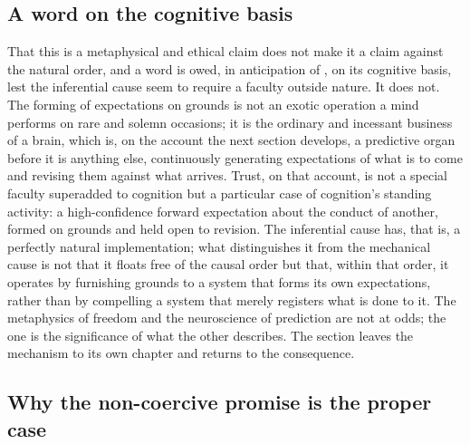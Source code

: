 \subsection{A word on the cognitive basis}
\label{p13:sub:free-cognitive}

That this is a metaphysical and ethical claim does not make it a claim against the natural order, and a word is owed, in anticipation of , on its cognitive basis, lest the inferential cause seem to require a faculty outside nature. It does not. The forming of expectations on grounds is not an exotic operation a mind performs on rare and solemn occasions; it is the ordinary and incessant business of a brain, which is, on the account the next section develops, a predictive organ before it is anything else, continuously generating expectations of what is to come and revising them against what arrives. Trust, on that account, is not a special faculty superadded to cognition but a particular case of cognition's standing activity: a high-confidence forward expectation about the conduct of another, formed on grounds and held open to revision. The inferential cause has, that is, a perfectly natural implementation; what distinguishes it from the mechanical cause is not that it floats free of the causal order but that, within that order, it operates by furnishing grounds to a system that forms its own expectations, rather than by compelling a system that merely registers what is done to it. The metaphysics of freedom and the neuroscience of prediction are not at odds; the one is the significance of what the other describes. The section leaves the mechanism to its own chapter and returns to the consequence.

\subsection{Why the non-coercive promise is the proper case}
\label{p13:sub:free-proper}

